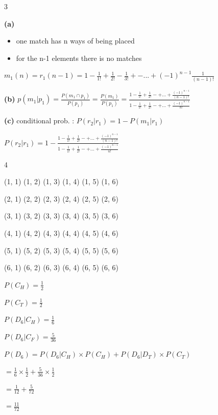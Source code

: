 \documentclass[12 pt]{article}
\begin{document}
    \begin{exercise}{3}
    \hfill

    \textbf{(a)}
    \begin{itemize}
        \item one match has n ways of being placed
        \item for the n-1 elements there is no matches
    \end{itemize}

    $m_1(n) = r_1(n - 1) = 1 - \frac{1}{1!} + \frac{1}{2!} - \frac{1}{3!} +- ... + (-1)^{n-1} \frac{1}{(n-1)!}$

    \hfill

    \textbf{(b)}
    $p(m_1|p_1) = \frac{P(m_1 \cap p_1)}{P(p_1)} = \frac{P(m_1)}{P(p_1)} = \frac{1 - \frac{1}{1!} + \frac{1}{2!} -+ ... + \frac{(-1)^{n-1}}{(n-1)!}}{1 - \frac{1}{1!} + \frac{1}{2!} -+ ... + \frac{(-1)^{n-1}}{n!}}$

    \hfill

    \textbf{(c)} conditional prob. : $P(r_2|r_1) = 1 - P(m_1|r_1)$

    $P(r_2|r_1) = 1 - \frac{1 - \frac{1}{1!} + \frac{1}{2!} -+ ... + \frac{(-1)^{n-1}}{(n-1)!}}{1 - \frac{1}{1!} + \frac{1}{2!} -+ ... + \frac{(-1)^{n-1}}{n!}}$   
    \end{exercise}



    \begin{exercise}{4}
    \hfill

    (1, 1) (1, 2) (1, 3) (1, 4) (1, 5) (1, 6)

    (2, 1) (2, 2) (2, 3) (2, 4) (2, 5) (2, 6)

    (3, 1) (3, 2) (3, 3) (3, 4) (3, 5) (3, 6)

    (4, 1) (4, 2) (4, 3) (4, 4) (4, 5) (4, 6)

    (5, 1) (5, 2) (5, 3) (5, 4) (5, 5) (5, 6)

    (6, 1) (6, 2) (6, 3) (6, 4) (6, 5) (6, 6)

    \hfill

    $P(C_H) = \frac{1}{2}$

    $P(C_T) = \frac{1}{2}$

    $P(D_6 | C_H) = \frac{1}{6}$

    $P(D_6 | C_F) = \frac{5}{36}$

    $P(D_6) = P(D_6 | C_H) \times P(C_H) + P(D_6 | D_T) \times P(C_T)$

    $= \frac{1}{6} \times \frac{1}{2} + \frac{5}{36} \times \frac{1}{2}$

    $= \frac{1}{12} + \frac{5}{72}$

    $= \frac{11}{72}$
    \end{exercise}
\end{document}
